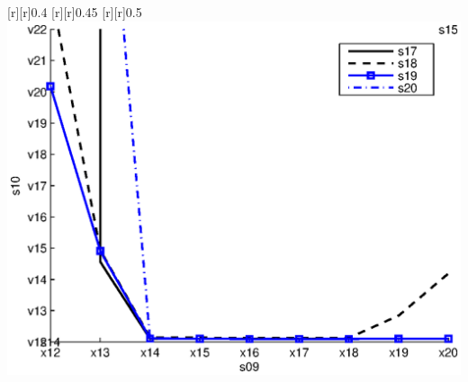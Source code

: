 \begin{psfrags}
[r][r]{0.4}%
[r][r]{0.45}%
[r][r]{0.5}%
%
\includegraphics[width=15cm]{mrmse_30.eps}%
\end{psfrags}%
%
